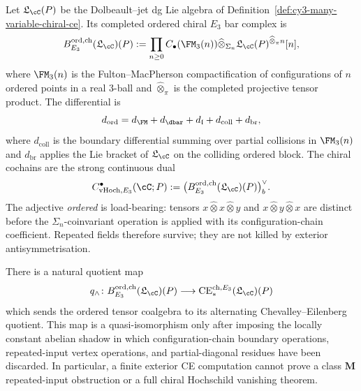 \begin{definition}
\label{def:ordered-chiral-e3-bar}
Let $\mathfrak L_{\cC}(P)$ be the Dolbeault--jet dg Lie algebra of
Definition~\ref{def:cy3-many-variable-chiral-ce}. Its completed ordered
chiral $E_3$ bar complex is
\[
 B^{\mathrm{ord,ch}}_{E_3}(\mathfrak L_{\cC})(P)
 :=
 \prod_{n\geq0}
 C_\bullet(\FM_3(n))
 \widehat\otimes_{\Sigma_n}
 \mathfrak L_{\cC}(P)^{\widehat\otimes_\pi n}[n],
\]
where $\FM_3(n)$ is the Fulton--MacPherson compactification of
configurations of $n$ ordered points in a real $3$-ball and
$\widehat\otimes_\pi$ is the completed projective tensor product. The
differential is
\[
 d_{\mathrm{ord}}
 =
 d_{\FM}
 +d_{\dbar}
 +d_{\mathfrak l}
 +d_{\mathrm{coll}}
 +d_{\mathrm{br}},
\]
where $d_{\mathrm{coll}}$ is the boundary differential summing over
partial collisions in $\FM_3(n)$ and $d_{\mathrm{br}}$ applies the Lie
bracket of $\mathfrak L_{\cC}$ on the colliding ordered block. The
chiral cochains are the strong continuous dual
\[
 C^{\bullet}_{\mathrm{vHoch},E_3}(\cC;P)
 :=
 \bigl(B^{\mathrm{ord,ch}}_{E_3}(\mathfrak L_{\cC})(P)\bigr)^\vee_b .
\]
The adjective \emph{ordered} is load-bearing: tensors
$x\widehat\otimes x\widehat\otimes y$ and
$x\widehat\otimes y\widehat\otimes x$ are distinct before the
$\Sigma_n$-coinvariant operation is applied with its configuration-chain
coefficient. Repeated fields therefore survive; they are not killed by
exterior antisymmetrisation.
\end{definition}

\begin{proposition}
\label{prop:exterior-ce-shadow-not-controller}
There is a natural quotient map
\[
 q_{\wedge}\colon
 B^{\mathrm{ord,ch}}_{E_3}(\mathfrak L_{\cC})(P)
 \longrightarrow
 \mathrm{CE}^{\mathrm{ch},E_3}_*(\mathfrak L_{\cC})(P)
\]
which sends the ordered tensor coalgebra to its alternating
Chevalley--Eilenberg quotient. This map is a quasi-isomorphism only
after imposing the locally constant abelian shadow in which
configuration-chain boundary operations, repeated-input vertex
operations, and partial-diagonal residues have been discarded. In
particular, a finite exterior CE computation cannot prove a class
$\mathbf M$ repeated-input obstruction or a full chiral Hochschild
vanishing theorem.
\end{proposition}

